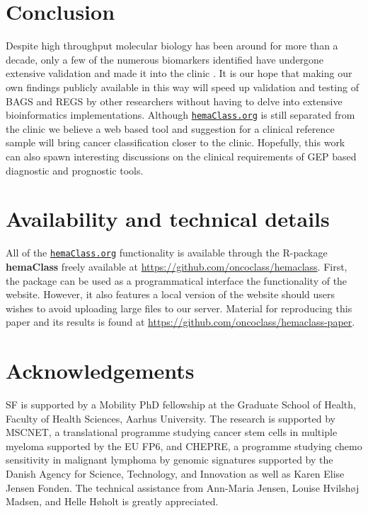 \documentclass{article}
\newcommand{\hemaClass}{\href{http://hemaClass.org}{\texttt{hemaClass.org}}}
\newcommand{\R}{\textsf{R}}
\begin{document}
\section{Conclusion}
Despite high throughput molecular biology has been around for more than a decade, only a few of the numerous biomarkers identified have undergone extensive validation and made it into the clinic \citep{Chen2012a}.
It is our hope that making our own findings publicly available in this way will speed up validation and testing of BAGS and REGS by other researchers without having to delve into extensive bioinformatics implementations.
Although \hemaClass{} is still separated from the clinic we believe a web based tool and suggestion for a clinical reference sample will bring cancer classification closer to the clinic.
Hopefully, this work can also spawn interesting discussions on the clinical requirements of GEP based diagnostic and prognostic tools.

{}
\section*{Availability and technical details}
All of the \hemaClass{} functionality is available through the \R{}-package \textbf{hemaClass} freely available at
\url{https://github.com/oncoclass/hemaclass}.
First, the package can be used as a programmatical interface the functionality of the website.
However, it also features a local version of the website should users wishes to avoid uploading large files to our server.
Material for reproducing this paper and its results is found at \url{https://github.com/oncoclass/hemaclass-paper}.

{}
\section*{Acknowledgements}
SF is supported by a Mobility PhD fellowship at the Graduate School of Health, Faculty of Health Sciences, Aarhus University.
The research is supported by MSCNET, a translational programme studying cancer stem cells in multiple myeloma supported by the EU FP6, and CHEPRE, a programme studying chemo sensitivity in malignant lymphoma by genomic signatures supported by the Danish Agency for Science, Technology, and Innovation as well as Karen Elise Jensen Fonden.
The technical assistance from Ann-Maria Jensen, Louise Hvilsh{\o}j Madsen, and Helle H{\o}holt is greatly appreciated.
\end{document}
